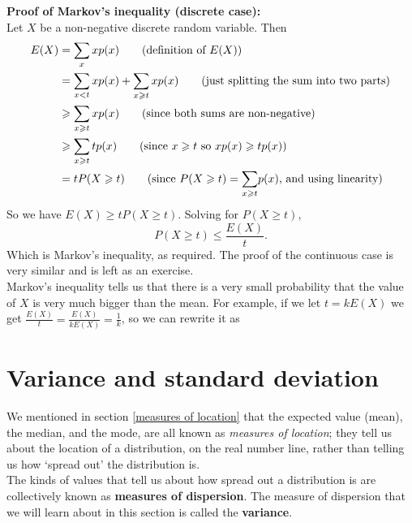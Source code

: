 \noindent \textbf{Proof of Markov's inequality (discrete case):} \\
Let $X$ be a non-negative discrete random variable. Then
\begin{align*}
E(X)  & = \sum_x xp(x) \tag{definition of $E(X)$} \\
	& = \sum_{x < t}xp(x) + \sum_{x \geq t}xp(x) \tag{just splitting the sum into two parts} \\
	& \geq  \sum_{x \geq t}xp(x) \tag{since both sums are non-negative} \\
	& \geq \sum_{x \geq t}tp(x) \tag{since $x \geq t$ so $xp(x) \geq tp(x)$} \\
	& = tP(X \geq t) \tag{since $P(X \geq t) = \displaystyle{\sum_{x \geq t}}p(x)$, and using linearity}
\end{align*}
So we have $E(X) \geq tP(X \geq t)$. Solving for $P(X \geq t)$,
\[
P(X \geq t) \leq \frac{E(X)}{t}. \tag{since $t > 0$}
\]
Which is Markov's inequality, as required. The proof of the continuous case is very similar and is left as an exercise. \\

\noindent Markov's inequality tells us that there is a very small probability that the value of $X$ is very much bigger than the mean. For example, if we let $t = kE(X)$ we get $\frac{E(X)}{t} = \frac{E(X)}{kE(X)} = \frac{1}{k}$, so we can rewrite it as

  	\bigskip
	
	\hfil{}
	\bigskip
	\bigskip

\section{Variance and standard deviation} \label{variance} \label{measure of dispersion} \label{distance}
We mentioned in section \ref{measures of location} that the expected value (mean), the median, and the mode, are all known as \textit{measures of location}; they tell us about the location of a distribution, on the real number line, rather than telling us how `spread out' the distribution is. \\

\noindent The kinds of values that tell us about how spread out a distribution is are collectively known as \textbf{measures of dispersion}. The measure of dispersion that we will learn about in this section is called the \textbf{variance}. \\

